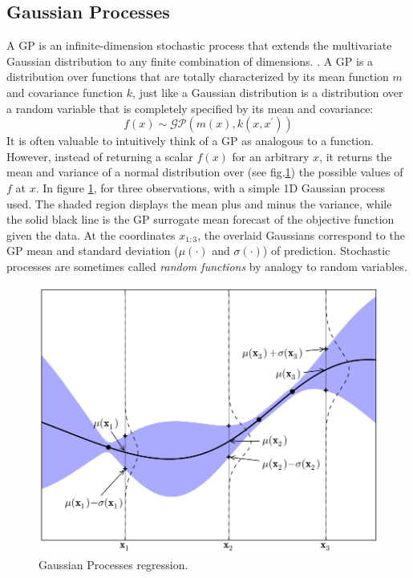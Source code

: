 \subsection{Gaussian Processes}
A GP is an infinite-dimension stochastic process that extends the multivariate Gaussian distribution to any finite combination of dimensions. \cite{Freitas-BO}. A GP is a distribution over functions that are totally characterized by its mean function $m$ and covariance function $k$, just like a Gaussian distribution is a distribution over a random variable that is completely specified by its mean and covariance: 
$$ f(x) \sim \mathcal{GP}(m(x),k(x,x^\prime)) $$
It is often valuable to intuitively think of a GP as analogous to a function. However, instead of returning a scalar $f(x)$ for an arbitrary $x$, it returns the mean and variance of a normal distribution over (see fig.\ref{fig:gp-example}) the possible values of $f$ at $x$. 
In figure \ref{fig:gp-example}, for three observations, with a simple 1D Gaussian process used. The shaded region displays the mean plus and minus the variance, while the solid black line is the GP surrogate mean forecast of the objective function given the data. At the coordinates $x_{1:3}$, the overlaid Gaussians correspond to the GP mean and standard deviation ($\mu(\cdot)$ and $\sigma(\cdot)$) of prediction.
Stochastic processes are sometimes called \textit{random functions} by analogy to random variables.
\begin{figure}[H]
	\centering
	\includegraphics[scale=0.40]{figures/gp.png}
	\caption{Gaussian Processes regression.}
	\label{fig:gp-example}
\end{figure}

